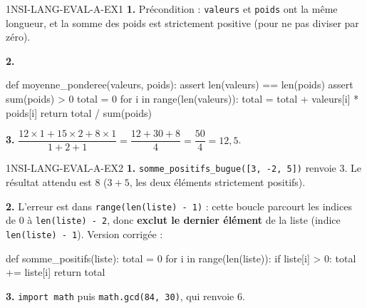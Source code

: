 \begin{corrige}{1NSI-LANG-EVAL-A-EX1}
\textbf{1.} Précondition : \lstinline{valeurs} et \lstinline{poids} ont la même longueur,
et la somme des poids est strictement positive (pour ne pas diviser par zéro).

\textbf{2.}
\begin{python}
def moyenne_ponderee(valeurs, poids):
    assert len(valeurs) == len(poids)
    assert sum(poids) > 0
    total = 0
    for i in range(len(valeurs)):
        total = total + valeurs[i] * poids[i]
    return total / sum(poids)
\end{python}

\textbf{3.} $\dfrac{12\times1+15\times2+8\times1}{1+2+1}=\dfrac{12+30+8}{4}=\dfrac{50}{4}=12{,}5$.
\end{corrige}

\begin{corrige}{1NSI-LANG-EVAL-A-EX2}
\textbf{1.} \lstinline{somme_positifs_bugue([3, -2, 5])} renvoie $3$. Le résultat attendu
est $8$ ($3+5$, les deux éléments strictement positifs).

\textbf{2.} L'erreur est dans \lstinline{range(len(liste) - 1)} : cette boucle parcourt les
indices de $0$ à \lstinline{len(liste) - 2}, donc \textbf{exclut le dernier élément} de la
liste (indice \lstinline{len(liste) - 1}). Version corrigée :
\begin{python}
def somme_positifs(liste):
    total = 0
    for i in range(len(liste)):
        if liste[i] > 0:
            total += liste[i]
    return total
\end{python}

\textbf{3.} \lstinline{import math} puis \lstinline{math.gcd(84, 30)}, qui renvoie $6$.
\end{corrige}
